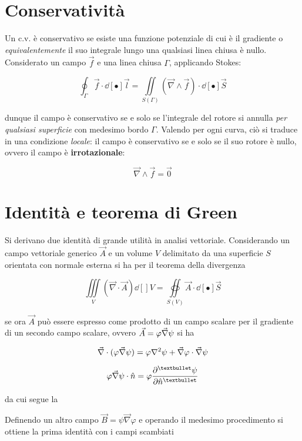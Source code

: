 \section{Conservatività}
Un c.v. è conservativo se esiste una funzione potenziale di cui è il gradiente o \textit{equivalentemente} il suo integrale lungo una qualsiasi linea chiusa è nullo.
\\Considerato un campo $\vec{f}$ e una linea chiusa $\Gamma$, applicando Stokes:

\[\oint_\Gamma \vec{f} \cdot \dd[•]{\vec{l}} = \iint\limits_{S(\Gamma)} (\vec{\nabla} \wedge \vec{f}) \cdot \dd[•]{\vec{S}}\]

dunque il campo è conservativo se e solo se l'integrale del rotore si annulla \textit{per qualsiasi superficie} con medesimo bordo $\Gamma$. Valendo per ogni curva, ciò si traduce in una condizione \textit{locale}: il campo è conservativo se e solo se il suo rotore è nullo, ovvero il campo è \textbf{irrotazionale}:

\[\vec{\nabla} \wedge \vec{f} = \vec{0}\]

\section{Identità e teorema di Green}

Si derivano due identità di grande utilità in analisi vettoriale. Considerando un campo vettoriale generico $\vec{A}$ e un volume $V$ delimitato da una superficie $S$ orientata con normale esterna si ha per il teorema della divergenza

\[\iiint\limits_V (\vec{\nabla} \cdot \vec{A}) \dd[]{V} = \oiint\limits_{S(V)} \vec{A} \cdot \dd[•]{\vec{S}}\]

se ora $\vec{A}$ può essere espresso come prodotto di un campo scalare per il gradiente di un secondo campo scalare, ovvero $\displaystyle \vec{A} = \varphi \vec{\nabla} \psi$ si ha

\[\vec{\nabla} \cdot (\varphi \vec{\nabla} \psi) = \varphi \laplacian \psi + \vec{\nabla} \varphi \cdot \vec{\nabla} \psi\]

\[\varphi \vec{\nabla} \psi \cdot \hat{n} = \varphi \pdv[•]{\psi}{\hat{n}}\]

da cui segue la 


Definendo un altro campo $\vec{B} = \psi \vec{\nabla} \varphi$ e operando il medesimo procedimento si ottiene la prima identità con i campi scambiati


